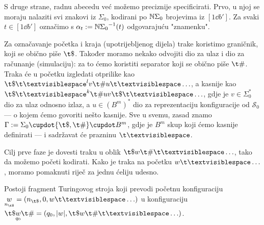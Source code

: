 S druge strane, radnu abecedu već možemo preciznije specificirati. Prvo, u njoj se moraju nalaziti svi znakovi iz $\Sigma_0$, kodirani po ${\mathbb N}\Sigma_0$ brojevima iz $[1\dd b']$. Za svaki $t\in[1\dd b']$ označimo s $\alpha_t:={{\mathbb N}\Sigma_0}^{-1}(t)$ odgovarajuću "znamenku".  %

Za označavanje početka i kraja (upotrijebljenog dijela) trake koristimo graničnik, koji se obično piše $\t\$$. Također moramo nekako odvojiti dio za ulaz i dio za računanje (simulaciju): za to ćemo koristiti separator koji se obično piše $\t\#$. Traka će u početku izgledati otprilike kao $\t\$\bl^lv\t\#u\bl\ldots$, a kasnije kao $\t\$\bl^k\t\#uv\t\$\bl\ldots$, gdje je $v\in\Sigma_0^*$ dio za ulaz odnosno izlaz, a $u\in(B^m)^*$ dio za reprezentaciju konfiguracije od $\mathcal S_0$ --- o kojem ćemo govoriti nešto kasnije. Sve u svemu, zasad znamo
    $\Gamma:=\Sigma_0\dcup\{\t\$,\t\#\}\dcup B^m$,
gdje je $B^m$ skup koji ćemo kasnije definirati --- i sadržavat će prazninu $\bl$.


Cilj prve faze je dovesti traku u oblik $\t\$w\t\#\bl\ldots$, tako da možemo početi kodirati. Kako je traka na početku $w\bl\ldots$, moramo pomaknuti riječ za jednu ćeliju udesno.

\begin{lema}[{name=[prvi fragment transpiliranog stroja]}]\label{lm:faza1}
    Postoji fragment Turingovog stroja koji prevodi početnu konfiguraciju $\underset{n_{\t\$}}{w}=(n_{\t\$},0,w\bl\ldots)$ u konfiguraciju $\t\$\underset{q_0}{w}\t\#=(q_0,\dulj{w},\t\$w\t\#\bl\ldots)$.
\vspace{-6pt}
\end{lema}

